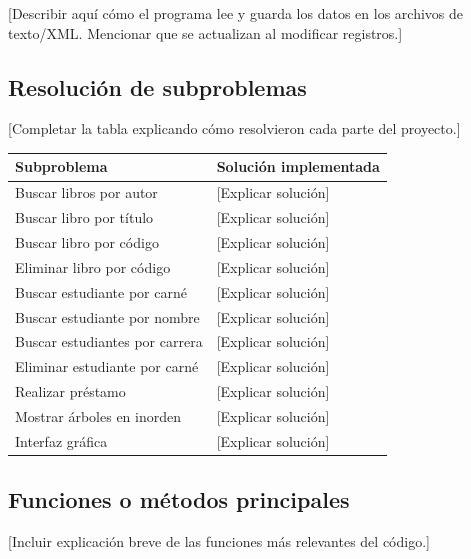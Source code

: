 \documentclass[11pt]{article}
\begin{document}
[Describir aquí cómo el programa lee y guarda los datos en los archivos de texto/XML. Mencionar que se actualizan al modificar registros.]

\subsection{Resolución de subproblemas}

[Completar la tabla explicando cómo resolvieron cada parte del proyecto.]

\begin{longtable}{p{} p{}}
\toprule
\textbf{Subproblema} & \textbf{Solución implementada} \\
\midrule
Buscar libros por autor & [Explicar solución] \\
Buscar libro por título & [Explicar solución] \\
Buscar libro por código & [Explicar solución] \\
Eliminar libro por código & [Explicar solución] \\
Buscar estudiante por carné & [Explicar solución] \\
Buscar estudiante por nombre & [Explicar solución] \\
Buscar estudiantes por carrera & [Explicar solución] \\
Eliminar estudiante por carné & [Explicar solución] \\
Realizar préstamo & [Explicar solución] \\
Mostrar árboles en inorden & [Explicar solución] \\
Interfaz gráfica & [Explicar solución] \\
\bottomrule
\end{longtable}

\subsection{Funciones o métodos principales}

[Incluir explicación breve de las funciones más relevantes del código.]
\end{document}
